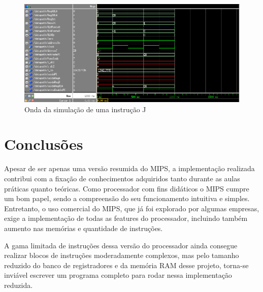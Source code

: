\documentclass{article}
\begin{document}
    \begin{figure}[H]
        \centering
        \includegraphics[width=\textwidth]{jump_wave.jpg}
        \caption{Onda da simulação de uma instrução J}
        \label{figura:mips}
    \end{figure}

    \section{Conclusões}

    \par Apesar de ser apenas uma versão resumida do MIPS, a implementação
    realizada contribui com a fixação de conhecimentos adquiridos tanto durante
    as aulas práticas quanto teóricas. Como processador com fins didáticos o
    MIPS cumpre um bom papel, sendo a compreensão do seu funcionamento
    intuitiva e simples.  Entretanto, o uso comercial do MIPS, que já foi
    explorado por algumas empresas, exige a implementação de todas as features
    do processador, incluindo também aumento nas memórias e quantidade de
    instruções.

    A gama limitada de instruções dessa versão do processador ainda consegue
    realizar blocos de instruções moderadamente complexos, mas pelo tamanho
    reduzido do banco de registradores e da memória RAM desse projeto, torna-se
    inviável escrever um programa completo para rodar nessa implementação
    reduzida.
\end{document}
